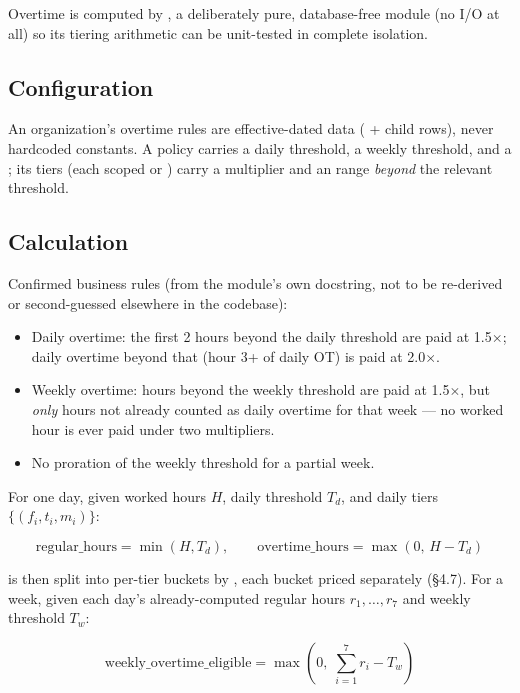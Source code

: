 Overtime is computed by , a deliberately
pure, database-free module (no I/O at all) so its tiering arithmetic
can be unit-tested in complete isolation.

\subsection*{Configuration}

An organization's overtime rules are effective-dated data
( + child  rows), never
hardcoded constants. A policy carries a daily threshold, a weekly
threshold, and a ; its tiers (each scoped
 or ) carry a multiplier and an
\code{[from\_hours, to\_hours)} range \emph{beyond} the relevant
threshold.

\subsection*{Calculation}

Confirmed business rules (from the module's own docstring, not to be
re-derived or second-guessed elsewhere in the codebase):

\begin{itemize}[nosep]
  \item Daily overtime: the first 2 hours beyond the daily threshold
        are paid at 1.5$\times$; daily overtime beyond that (hour 3+ of
        daily OT) is paid at 2.0$\times$.
  \item Weekly overtime: hours beyond the weekly threshold are paid at
        1.5$\times$, but \emph{only} hours not already counted as daily
        overtime for that week --- no worked hour is ever paid under
        two multipliers.
  \item No proration of the weekly threshold for a partial week.
\end{itemize}

For one day, given worked hours $H$, daily threshold $T_d$, and daily
tiers $\{(f_i, t_i, m_i)\}$:

\[
  \text{regular\_hours} = \min(H, T_d), \qquad
  \text{overtime\_hours} = \max(0,\, H - T_d)
\]

 is then split into per-tier buckets by
, each bucket priced separately (\S4.7). For a week,
given each day's already-computed regular hours $r_1,\dots,r_7$ and
weekly threshold $T_w$:

\[
  \text{weekly\_overtime\_eligible} = \max\!\left(0,\; \sum_{i=1}^{7} r_i - T_w\right)
\]

